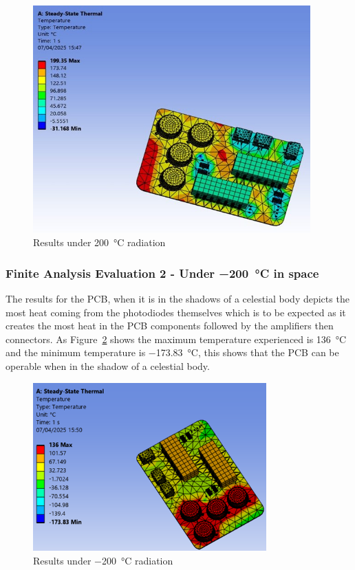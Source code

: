 \begin{figure}[H]
    \centering
    \includegraphics[width=0.95\textwidth]{chapters/methodology/ThermalAnalysis/Fig2under200C.jpg}
    \caption{Results under \SI{200}{\celsius} radiation}
    \label{fig:results_200C}
\end{figure}




\subsubsection{Finite Analysis Evaluation 2 - Under \SI{-200}{\celsius} in space}

The results for the PCB, when it is in the shadows of a celestial body
depicts the most heat coming from the photodiodes themselves which is to
be expected as it creates the most heat in the PCB components followed
by the amplifiers then connectors. As Figure~\ref{fig:results_minus_200C} shows the maximum
temperature experienced is \SI{136}{\celsius} and the minimum temperature is
\SI{-173.83}{\celsius}, this shows that the PCB can be operable when in the shadow of
a celestial body.

\begin{figure}[H]
    \centering
    \includegraphics[width=0.8\textwidth]{chapters/methodology/ThermalAnalysis/Fig3underneg200c.png}
    \caption{Results under \SI{-200}{\celsius} radiation}
    \label{fig:results_minus_200C}
\end{figure}

